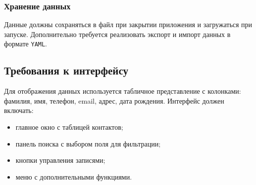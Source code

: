 \subsubsection*{Хранение данных}
Данные должны сохраняться в файл при закрытии приложения и загружаться при запуске. Дополнительно требуется реализовать экспорт и импорт данных в формате \verb|YAML|.

\subsection{Требования к интерфейсу}

Для отображения данных используется табличное представление с колонками: фамилия, имя, телефон, email, адрес, дата рождения. Интерфейс должен включать:
\begin{itemize}
    \item главное окно с таблицей контактов;
    \item панель поиска с выбором поля для фильтрации;
    \item кнопки управления записями;
    \item меню с дополнительными функциями.
\end{itemize}